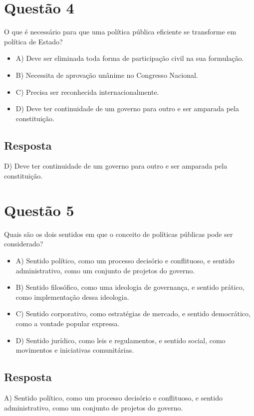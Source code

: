 \documentclass[
   article,       
   12pt,          
   oneside,       
   a4paper,       
   english,       
   brazil,        
   sumario=tradicional
   ]{abntex2}
\begin{document}
\section{Questão 4}
O que é necessário para que uma política pública eficiente se transforme em política de Estado?
\begin{itemize}
    \item {A) Deve ser eliminada toda forma de participação civil na sua formulação.}
    \item {B) Necessita de aprovação unânime no Congresso Nacional.}
    \item {C) Precisa ser reconhecida internacionalmente.}
    \item {D) Deve ter continuidade de um governo para outro e ser amparada pela constituição.}
\end{itemize}

\subsection{Resposta}
D) Deve ter continuidade de um governo para outro e ser amparada pela constituição.

\section{Questão 5}
Quais são os dois sentidos em que o conceito de políticas públicas pode ser considerado?
\begin{itemize}
    \item {A) Sentido político, como um processo decisório e conflituoso, e sentido administrativo, como um conjunto de projetos do governo.}
    \item {B) Sentido filosófico, como uma ideologia de governança, e sentido prático, como implementação dessa ideologia.}
    \item {C) Sentido corporativo, como estratégias de mercado, e sentido democrático, como a vontade popular expressa.}
    \item {D) Sentido jurídico, como leis e regulamentos, e sentido social, como movimentos e iniciativas comunitárias.}
\end{itemize}

\subsection{Resposta}
A) Sentido político, como um processo decisório e conflituoso, e sentido administrativo, como um conjunto de projetos do governo.
\end{document}
